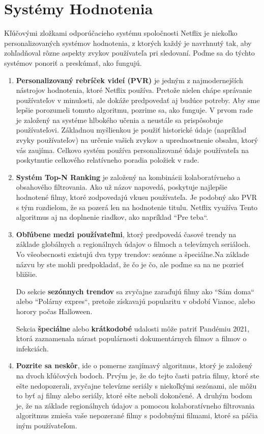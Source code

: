 \documentclass[10pt,slovak,a4paper]{article}
\begin{document}
\section{Systémy Hodnotenia}
 Kľúčovými zložkami odporúčacieho systému spoločnosti Netflix je niekoľko personalizovaných systémov hodnotenia, z ktorých každý je navrhnutý tak, aby zohľadňoval rôzne aspekty zvykov používateľa pri sledovaní. Poďme sa do týchto systémov ponoriť a preskúmať, ako fungujú.
\begin{enumerate}
    \item \textbf{Personalizovaný rebríček videí (PVR)} je jedným z najmodernejších  nástrojov hodnotenia, ktoré Netflix používa.\cite{Hodnotenie} Pretože nielen chápe správanie používateľov v minulosti, ale dokáže predpovedať aj budúce potreby. Aby sme lepšie porozumeli tomuto algoritmu, pozrime sa, ako funguje. V prvom rade je založený na systéme hlbokého učenia a neustále sa prispôsobuje používateľovi. Základnou myšlienkou je použiť historické údaje (napríklad zvyky používateľov) na určenie vašich zvykov a uprednostnenie obsahu, ktorý vás zaujíma. Celkovo systém používa personalizované údaje používateľa na poskytnutie celkového relatívneho poradia položiek v rade.

    \item \textbf{Systém Top-N Ranking} je založený na kombinácii kolaboratívneho a obsahového filtrovania. Ako už názov napovedá, poskytuje najlepšie hodnotené filmy, ktoré zodpovedajú vkusu používateľa. Je podobný ako PVR s tým rozdielom, že sa pozerá len na hodnotenie titulu. Netflix využíva Tento algoritmus aj na doplnenie riadkov, ako napríklad  “Pre teba“.

    \item\textbf{Obľúbene medzi používateľmi}, ktorý predpovedá časové trendy na základe globálnych a regionálnych údajov o filmoch a televíznych seriáloch. Vo všeobecnosti existujú dva typy trendov: sezónne a špeciálne.Na základe názvu by ste mohli predpokladať, že čo je čo, ale poďme sa na ne pozrieť bližšie.
    
    Do sekcie \textbf{sezónnych trendov} sa zvyčajne zaraďujú filmy ako “Sám doma“ alebo “Polárny expres“, pretože získavajú popularitu v období Vianoc, alebo horory počas Halloween.

    Sekcia \textbf{špeciálne} alebo \textbf{krátkodobé} udalosti môže patriť Pandémiu 2021, ktorá zaznamenala nárast populárnosti dokumentárnych filmov a filmov o infekciách.

    \item \textbf{Pozrite sa neskôr}, ide o pomerne zaujímavý algoritmus, ktorý je založený na dvoch kľúčových bodoch. Prvým je, že do tejto časti patria filmy, ktoré ste ešte nedopozerali, zvyčajne televízne seriály s niekoľkými sezónami, ale môžu to byť aj filmy alebo seriály, ktoré ešte neboli dokončené. A druhým bodom je, že na základe regionálnych údajov a pomocou kolaboratívneho filtrovania algoritmus zmieša vaše nepozerané filmy s podobnými filmami, ktoré sa páčia iným používateľom.
    
\end{enumerate}
\end{document}
